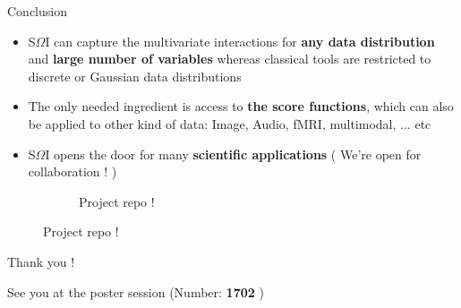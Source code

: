 \begin{frame}{Conclusion}
\begin{itemize}
    
    

    \item S$\Omega$I can capture the multivariate interactions for \textbf{any data distribution} and \textbf{large number of variables} whereas classical tools are restricted to discrete or Gaussian data distributions 
    
    
    \item The only needed ingredient is access to \textbf{the score functions}, which can also be applied to other kind of data: Image, Audio, fMRI, multimodal, $ \dots $ etc
    
    \item S$\Omega$I opens the door for many 
    \textbf{scientific applications} ( We're open for collaboration ! )
  
\end{itemize}

 \begin{figure}
    \begin{subfigure}[]{0.70\textwidth}
    \hspace{5cm}
    \end{subfigure}
    \begin{subfigure}[]{0.25\textwidth}
    \color{black}
    \centering
       {}
      \caption*{Project repo !}
    \end{subfigure}%
  \end{figure}
\end{frame}


\begin{frame}{}
\centering
\huge
Thank you !

\vspace{3cm}
\normalsize
\centering
 See you at the poster session (Number: \textbf{1702} )

 
    
\end{frame}

